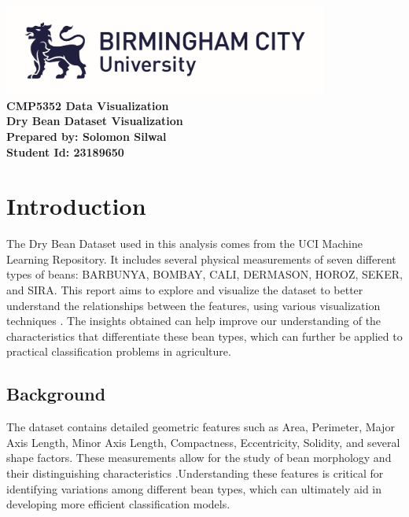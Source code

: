 \documentclass[a4paper,12pt]{article}
\begin{document}
\begin{titlepage}
    \begin{center}
        \includegraphics[width=0.8\textwidth]{graphs/uni_logo.png} \\[1.5cm]  
        
        
        \textbf{\Large CMP5352 Data Visualization} \\[0.5cm]
        \textbf{\large Dry Bean Dataset Visualization} \\[0.5cm]
        
       
        \textbf{Prepared by: Solomon Silwal} \\[0.5cm]
        \textbf{Student Id: 23189650} \\[0.5cm]
    \end{center}
\end{titlepage}

\tableofcontents
\listoffigures


\newpage

\section{Introduction}
The Dry Bean Dataset used in this analysis comes from the UCI Machine Learning Repository. It includes several physical measurements of seven different types of beans: BARBUNYA, BOMBAY, CALI, DERMASON, HOROZ, SEKER, and SIRA. This report aims to explore and visualize the dataset to better understand the relationships between the features, using various visualization techniques \cite{chawathe2021classification}. The insights obtained can help improve our understanding of the characteristics that differentiate these bean types, which can further be applied to practical classification problems in agriculture.

\subsection{Background}
The dataset contains detailed geometric features such as Area, Perimeter, Major Axis Length, Minor Axis Length, Compactness, Eccentricity, Solidity, and several shape factors. These measurements allow for the study of bean morphology and their distinguishing characteristics \cite{pena2021morphometry}.Understanding these features is critical for identifying variations among different bean types, which can ultimately aid in developing more efficient classification models.
\end{document}
